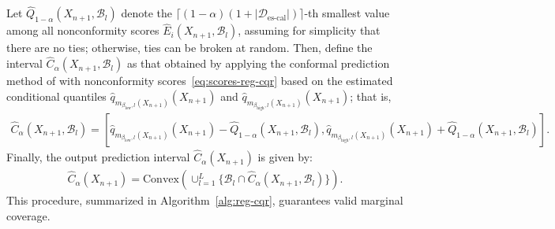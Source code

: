Let $\hat{Q}_{1-\alpha}(X_{n+1},\mathcal{B}_l)$ denote the $\lceil (1-\alpha)(1+|\mathcal{D}_{\text{es-cal}}|) \rceil$-th smallest value among all nonconformity scores $\hat{E}_i(X_{n+1},\mathcal{B}_l)$, assuming for simplicity that there are no ties; otherwise, ties can be broken at random. 
Then, define the interval $\hat{C}_{\alpha}(X_{n+1}, \mathcal{B}_l)$ as that obtained by applying the conformal prediction method of \citet{romano2019conformalized} with nonconformity scores~\eqref{eq:scores-reg-cqr} based on the estimated conditional quantiles $\hat{q}_{m_{\beta_{\text{low}},l}(X_{n+1})}(X_{n+1})$ and $\hat{q}_{m_{\beta_{\text{high}},l}(X_{n+1})}(X_{n+1})$; that is,
\begin{align} \label{eq:reg-int-tmp-cqr}
  \hat{C}_{\alpha}(X_{n+1}, \mathcal{B}_l) = [\hat{q}_{m_{\beta_{\text{low}},l}(X_{n+1})}(X_{n+1}) - \hat{Q}_{1-\alpha}(X_{n+1},\mathcal{B}_l), \hat{q}_{m_{\beta_{\text{high}},l}(X_{n+1})}(X_{n+1}) + \hat{Q}_{1-\alpha}(X_{n+1},\mathcal{B}_l)].
\end{align}
Finally, the output prediction interval $\hat{C}_{\alpha}(X_{n+1})$ is given by:
\begin{align} \label{eq:reg-int-cqr}
  \hat{C}_{\alpha}(X_{n+1}) = \text{Convex}\left( \cup_{l=1}^{L} \{ \mathcal{B}_l \cap \hat{C}_{\alpha}(X_{n+1}, \mathcal{B}_l) \} \right).
\end{align}
This procedure, summarized in Algorithm~\ref{alg:reg-cqr}, guarantees valid marginal coverage.

